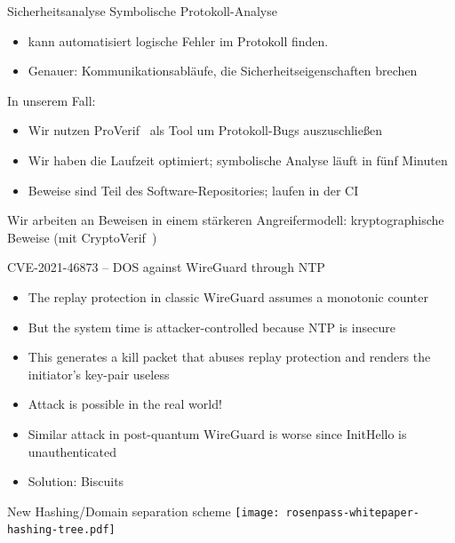 \documentclass[german]{rosenpass-beamer}
\begin{document}
\begin{frame}{Sicherheitsanalyse}
  Symbolische Protokoll-Analyse
	\begin{itemize}
		\item kann automatisiert logische Fehler im Protokoll finden.
		\item Genauer: Kommunikationsabläufe, die Sicherheitseigenschaften brechen
\end{itemize}

In unserem Fall:
  \begin{itemize}
    \item Wir nutzen ProVerif~\cite{proverif} als Tool um Protokoll-Bugs auszuschließen
    \item Wir haben die Laufzeit optimiert; symbolische Analyse läuft in fünf Minuten
    \item Beweise sind Teil des Software-Repositories; laufen in der CI
  \end{itemize}

	Wir arbeiten an Beweisen in einem stärkeren Angreifermodell: kryptographische Beweise (mit CryptoVerif~\cite{cryptoverif})
\end{frame}

\begin{frame}{CVE-2021-46873 – DOS against WireGuard through NTP}
\begin{itemize}
  \item The replay protection in classic WireGuard assumes a monotonic counter
  \item But the system time is attacker-controlled because NTP is insecure
  \item This generates a kill packet that abuses replay protection and renders the initiator's key-pair useless
  \item Attack is possible in the real world!
  \item Similar attack in post-quantum WireGuard is worse since InitHello is unauthenticated
  \item Solution: Biscuits
\end{itemize}
\end{frame}

\begin{frame}{New Hashing/Domain separation scheme}
  \texttt{[image: rosenpass-whitepaper-hashing-tree.pdf]}
\end{frame}

\printbibliography

\clearpage
\setcounter{framenumber}{\totalcontentframes}
\end{document}
